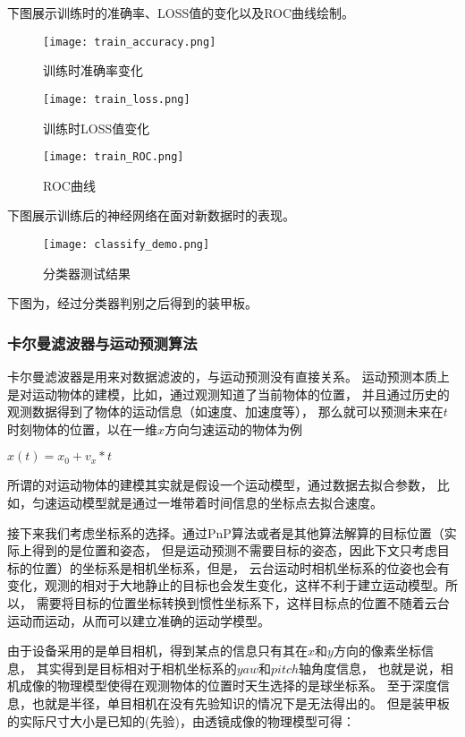 下图展示训练时的准确率、LOSS值的变化以及ROC曲线绘制。
\begin{figure}[H]
    \centering
    \texttt{[image: train\_accuracy.png]} 
    \caption{训练时准确率变化} 
\end{figure}

\begin{figure}[H]
    \centering
    \texttt{[image: train\_loss.png]} 
    \caption{训练时LOSS值变化} 
\end{figure}

\begin{figure}[H]
    \centering
    \texttt{[image: train\_ROC.png]} 
    \caption{ROC曲线} 
\end{figure}

下图展示训练后的神经网络在面对新数据时的表现。
\begin{figure}[H]
    \centering
    \texttt{[image: classify\_demo.png]} 
    \caption{分类器测试结果} 
\end{figure}

下图为，经过分类器判别之后得到的装甲板。
\subsubsection{卡尔曼滤波器与运动预测算法}

卡尔曼滤波器是用来对数据滤波的，与运动预测没有直接关系。
运动预测本质上是对运动物体的建模，比如，通过观测知道了当前物体的位置，
并且通过历史的观测数据得到了物体的运动信息（如速度、加速度等），
那么就可以预测未来在$t$时刻物体的位置，以在一维$x$方向匀速运动的物体为例 \par
$x(t) = x_0 + v_x*t$  \par
所谓的对运动物体的建模其实就是假设一个运动模型，通过数据去拟合参数，
比如，匀速运动模型就是通过一堆带着时间信息的坐标点去拟合速度。\par
接下来我们考虑坐标系的选择。通过PnP算法或者是其他算法解算的目标位置（实际上得到的是位置和姿态，
但是运动预测不需要目标的姿态，因此下文只考虑目标的位置）的坐标系是相机坐标系，但是，
云台运动时相机坐标系的位姿也会有变化，观测的相对于大地静止的目标也会发生变化，这样不利于建立运动模型。所以，
需要将目标的位置坐标转换到惯性坐标系下，这样目标点的位置不随着云台运动而运动，从而可以建立准确的运动学模型。\par
由于设备采用的是单目相机，得到某点的信息只有其在$x$和$y$方向的像素坐标信息，
其实得到是目标相对于相机坐标系的$yaw$和$pitch$轴角度信息，
也就是说，相机成像的物理模型使得在观测物体的位置时天生选择的是球坐标系。
至于深度信息，也就是半径，单目相机在没有先验知识的情况下是无法得出的。
但是装甲板的实际尺寸大小是已知的(先验)，由透镜成像的物理模型可得：\par

